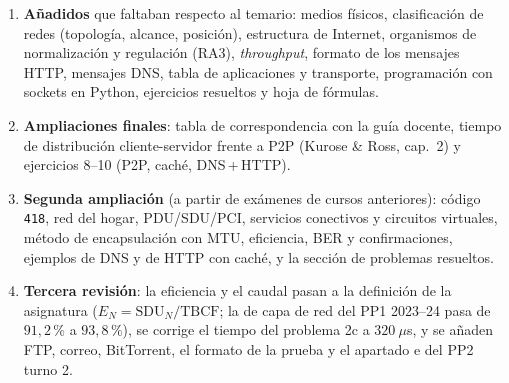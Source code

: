 \documentclass[11pt,a4paper]{article}
\begin{document}
\begin{nota}
\begin{enumerate}[leftmargin=1.6em]
  \item \textbf{Añadidos} que faltaban respecto al temario: medios físicos, clasificación de redes (topología, alcance, posición), estructura de Internet, organismos de normalización y regulación (RA3), \emph{throughput}, formato de los mensajes HTTP, mensajes DNS, tabla de aplicaciones y transporte, programación con sockets en Python, ejercicios resueltos y hoja de fórmulas.
  \item \textbf{Ampliaciones finales}: tabla de correspondencia con la guía docente, tiempo de distribución cliente-servidor frente a P2P (Kurose \& Ross, cap.~2) y ejercicios 8--10 (P2P, caché, DNS\,+\,HTTP).
  \item \textbf{Segunda ampliación} (a partir de exámenes de cursos anteriores): código \texttt{418}, red del hogar, PDU/SDU/PCI, servicios conectivos y circuitos virtuales, método de encapsulación con MTU, eficiencia, BER y confirmaciones, ejemplos de DNS y de HTTP con caché, y la sección de problemas resueltos.
  \item \textbf{Tercera revisión}: la eficiencia y el caudal pasan a la definición de la asignatura ($E_N=\text{SDU}_N/\text{TBCF}$; la de capa de red del PP1 2023--24 pasa de $91{,}2\,\%$ a $93{,}8\,\%$), se corrige el tiempo del problema 2c a $320~\mu$s, y se añaden FTP, correo, BitTorrent, el formato de la prueba y el apartado e del PP2 turno 2.
\end{enumerate}
\end{nota}
\end{document}

